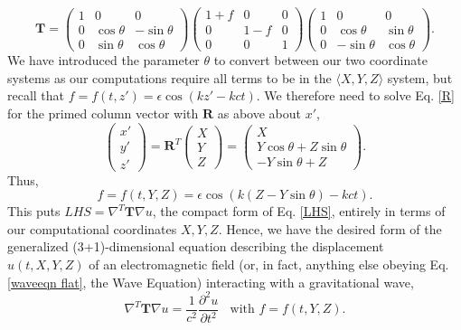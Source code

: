 \documentclass{article}
\begin{document}
\begin{equation} \label{T}
\textbf{T}=
\begin{pmatrix}
1 & 0 & 0 \\
0 & \cos\theta & -\sin\theta \\
0 & \sin\theta & \cos\theta
\end{pmatrix}
\begin{pmatrix}
1+f & 0 & 0 \\
0 & 1-f & 0 \\
0 & 0 & 1
\end{pmatrix}
\begin{pmatrix}
1 & 0 & 0 \\
0 & \cos\theta & \sin\theta \\
0 & -\sin\theta & \cos\theta
\end{pmatrix}.
\end{equation}
We have introduced the parameter $\theta$ to convert between our two coordinate systems as our computations require all terms to be in the $\langle X,Y,Z\rangle$ system, but recall that $f=f(t,z\prime)=\epsilon \cos(kz\prime-kct)$. We therefore need to solve Eq. \ref{R} for the primed column vector with $\textbf{R}$ as above about $x\prime$,
\begin{equation*}
\begin{pmatrix}
x\prime \\
y\prime \\
z\prime
\end{pmatrix}
= \textbf{R}^{T}\begin{pmatrix}
X \\
Y \\
Z
\end{pmatrix}
=\begin{pmatrix}
X \\
Y\cos\theta+Z\sin\theta \\
-Y\sin\theta+Z\
\end{pmatrix}.
\end{equation*}
Thus, \begin{equation} \label{f}
f=f(t,Y,Z)=\epsilon \cos(k(Z-Y\sin\theta)-kct).
\end{equation}
This puts $LHS = \nabla^T \textbf{T} \nabla u$, the compact form of Eq. \ref{LHS}, entirely in terms of our computational coordinates $X,Y,Z$. Hence, we have the desired form of the generalized (3+1)-dimensional equation describing the displacement $u(t,X,Y,Z)$ of an electromagnetic field (or, in fact, anything else obeying Eq. \ref{waveeqn flat}, the Wave Equation) interacting with a gravitational wave,
\begin{equation}\label{main eqn}
\boxed{
\nabla^T \textbf{T} \nabla u = \frac{1}{c^2}\frac{\partial^2 u}{\partial t^2} \ \ \ \ \mbox{with } f=f(t,Y,Z).
}
\end{equation}
\end{document}
